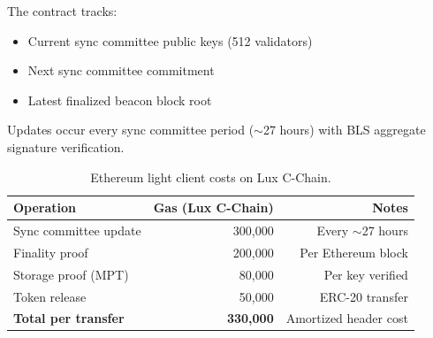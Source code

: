 \begin{definition}
The contract tracks:
\begin{itemize}
    \item Current sync committee public keys (512 validators)
    \item Next sync committee commitment
    \item Latest finalized beacon block root
\end{itemize}
Updates occur every sync committee period ($\sim$27 hours) with BLS aggregate signature verification.
\end{definition}

\begin{table}[H]
\centering
\caption{Ethereum light client costs on Lux C-Chain.}
\label{tab:eth_lc}
\begin{tabular}{lrr}
\toprule
\textbf{Operation} & \textbf{Gas (Lux C-Chain)} & \textbf{Notes} \\
\midrule
Sync committee update & 300,000 & Every $\sim$27 hours \\
Finality proof & 200,000 & Per Ethereum block \\
Storage proof (MPT) & 80,000 & Per key verified \\
Token release & 50,000 & ERC-20 transfer \\
\midrule
\textbf{Total per transfer} & \textbf{330,000} & Amortized header cost \\
\bottomrule
\end{tabular}
\end{table}

